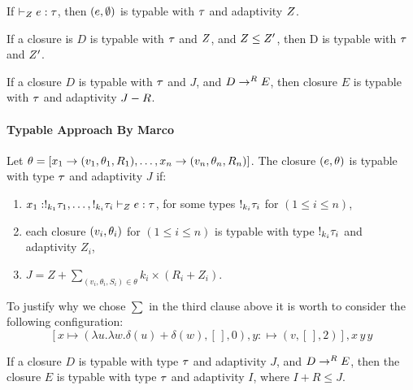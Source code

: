 \documentclass[a4paper,11pt]{article}
\theoremstyle{definition}
\begin{document}
\begin{lem}[programTypable]
  \label{proglemma}
   If $ \vdash_{Z}   e : \tau $, then $(
     e, \emptyset ) $ is typable with $\tau$ and adaptivity $Z$. 
   \end{lem}

   \begin{lem}[TypableMono]
     \label{tmono}
     If a closure is $D$ is typable with $\tau$ and $Z$, and $Z \leq Z'$, then
     D is typable with $\tau$ and $Z'$.
    \end{lem} 

   
\begin{lem}[TypableSoundness]
  \label{tsound}
  If a closure $D$ is typable with $\tau$ and $J$, and $D \mathrel{\to^{R}} E$, then
    closure $E$ is typable with $\tau$ and adaptivity $J - R$. 
   \end{lem}
\paragraph{Typable Approach By Marco}
\begin{defn}
  \label{def:typable}
Let $\theta=[ x_1 \to (v_1 ,  \theta_1 , R_1 ) ,
  \ldots, x_n \to (v_n, \theta_n, R_n )]$. 
  The closure $( e, \theta)$ is typable with
  type $\tau$ and adaptivity $J$ if:
\begin{enumerate}\item  
     $x_1 : !_{k_1} \tau_1, \ldots, !_{k_i} \tau_i 
     \vdash_{Z}  e : \tau$, for some types $!_{k_i}
   \tau_i$ for $(1\leq i\leq n)$, 
\item each closure $(v_i, \theta_i)$ for $(1\leq i\leq n)$ is typable with type
  $!_{k_i} \tau_i$ and adaptivity $Z_i$,
\item $J = Z + \sum_{(v_i,\theta_i,S_i)\in\theta} k_i \times (R_i
  +Z_i)$.
\end{enumerate}
 \end{defn}
To justify why we chose $\sum$ in the third clause above it is worth
to consider the following configuration:
$$
[x\mapsto (\lambda u.\lambda w.\delta(u)+\delta(w),[\,],0)
,y:\mapsto (v,[\,],2) ], x\, y\, y
$$
   
\begin{lem}[Soundness]
  \label{tsound}
  If a closure $D$ is typable with type $\tau$ and adaptivity $J$, and $D \mathrel{\to^{R}} E$, then
    the closure $E$ is typable with type $\tau$ and adaptivity $I$,
    where $I+R\leq J$. 
   \end{lem}
\end{document}
